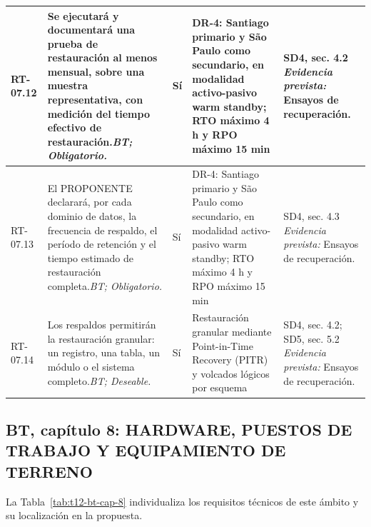 \begin{paginaHorizontalSynaptix}
\begin{longtable}{|L{0.09\AnchoMatrizTDoce}|L{0.385\AnchoMatrizTDoce}|L{0.065\AnchoMatrizTDoce}|L{0.18\AnchoMatrizTDoce}|L{0.28\AnchoMatrizTDoce}|}
RT-\allowbreak{}07.\allowbreak{}12 &
Se ejecutará y documentará una prueba de restauración al menos mensual, sobre una muestra representativa, con medición del tiempo efectivo de restauración.\newline\textit{BT; Obligatorio.} &
Sí &
DR-4: Santiago primario y São Paulo como secundario, en modalidad activo-pasivo warm standby; RTO máximo 4 h y RPO máximo 15 min &
SD4, sec. 4.2 \newline\textit{Evidencia prevista:} Ensayos de recuperación. \\ \hline

RT-\allowbreak{}07.\allowbreak{}13 &
El PROPONENTE declarará, por cada dominio de datos, la frecuencia de respaldo, el período de retención y el tiempo estimado de restauración completa.\newline\textit{BT; Obligatorio.} &
Sí &
DR-4: Santiago primario y São Paulo como secundario, en modalidad activo-pasivo warm standby; RTO máximo 4 h y RPO máximo 15 min &
SD4, sec. 4.3 \newline\textit{Evidencia prevista:} Ensayos de recuperación. \\ \hline

RT-\allowbreak{}07.\allowbreak{}14 &
Los respaldos permitirán la restauración granular: un registro, una tabla, un módulo o el sistema completo.\newline\textit{BT; Deseable.} &
Sí &
Restauración granular mediante Point-in-Time Recovery (PITR) y volcados lógicos por esquema &
SD4, sec. 4.2; SD5, sec. 5.2 \newline\textit{Evidencia prevista:} Ensayos de recuperación. \\ \hline

\end{longtable}


\subsection*{BT, capítulo 8: HARDWARE, PUESTOS DE TRABAJO Y EQUIPAMIENTO DE TERRENO}


La Tabla~\ref{tab:t12-bt-cap-8} individualiza los requisitos técnicos de este ámbito y su localización en la propuesta.

\begin{longtable}{|L{0.09\AnchoMatrizTDoce}|L{0.385\AnchoMatrizTDoce}|L{0.065\AnchoMatrizTDoce}|L{0.18\AnchoMatrizTDoce}|L{0.28\AnchoMatrizTDoce}|}


\end{longtable}
\end{paginaHorizontalSynaptix}
